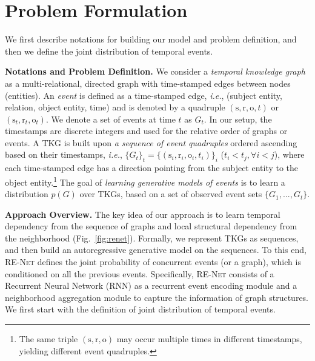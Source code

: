 \documentclass[11pt,a4paper]{article}
\newcommand{\prob}{p}
\newcommand{\calE}{G}
\newcommand{\method}{\textsc{RE-Net}\xspace}
\newcommand{\para}[1]{\smallskip\noindent\textbf{#1}}
\newcommand{\bs}{\mathrm{s}}
\newcommand{\br}{\mathrm{r}}
\newcommand{\bo}{\mathrm{o}}
\newcommand{\bt}{t}
\begin{document}





\section{Problem Formulation}
\label{sec:tkg}

We first describe notations for building our model and problem definition, and then we define the joint distribution of temporal events. 

\para{Notations and Problem Definition.}
We consider a \textit{temporal knowledge graph} as a multi-relational, directed graph with time-stamped edges between nodes (entities).
An \textit{event} is defined as a time-stamped edge, \textit{i.e.}, (subject entity, relation, object entity, time) and is denoted by a quadruple $(\bs,\br,\bo,t)$ or $(\bs_t, \br_t, \bo_t)$. We denote a set of events at time $t$ as ${\calE}_t$. 
In our setup, the timestamps are discrete integers and used for the relative order of graphs or events.
A TKG is built upon \textit{a sequence of event quadruples} ordered ascending based on their timestamps, \textit{i.e.}, $\{\calE_{\bt}\}_t = \{(\bs_i,\br_i,\bo_i,t_i)\}_i$ ($t_i < t_j, \forall i<j$), 
where each time-stamped edge has a direction pointing from the subject entity to the object entity.\footnote{The same triple $(\bs, \br, \bo)$ may occur multiple times in different timestamps, yielding different event quadruples.}  
The goal of \textit{learning generative models of events} is to learn a distribution $\prob(\calE)$ over TKGs, based on a set of observed event sets $\{\calE_1, ..., \calE_t\}$. 



\para{Approach Overview.}
The key idea of our approach is to learn temporal dependency from the sequence of graphs and local structural dependency from the neighborhood (Fig.~\ref{fig:renet}). 
Formally, we represent TKGs as sequences, and then build an autoregressive generative model on the sequences.
To this end, \method defines the joint probability of concurrent events (or a graph), which is conditioned on all the previous events.
Specifically, \method consists of a Recurrent Neural Network (RNN) as a recurrent event encoding module and a neighborhood aggregation module to capture the information of graph structures.
We first start with the definition of joint distribution of temporal events.
\end{document}
